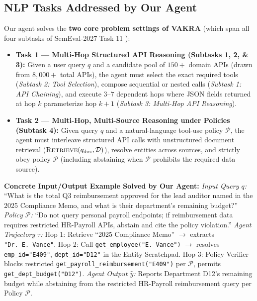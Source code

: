 \documentclass[10pt]{article}
\begin{document}
\subsection{NLP Tasks Addressed by Our Agent}
Our agent solves the \textbf{two core problem settings of VAKRA} (which span all four subtasks of SemEval-2027 Task 11 \cite{naik2027semeval}):
\begin{itemize}
    \item \textbf{Task 1 --- Multi-Hop Structured API Reasoning (Subtasks 1, 2, \& 3):} Given a user query $q$ and a candidate pool of $150+$ domain APIs (drawn from $8,000+$ total APIs), the agent must select the exact required tools (\textit{Subtask 2: Tool Selection}), compose sequential or nested calls (\textit{Subtask 1: API Chaining}), and execute $3\text{--}7$ dependent hops where JSON fields returned at hop $k$ parameterize hop $k+1$ (\textit{Subtask 3: Multi-Hop API Reasoning}).
    \item \textbf{Task 2 --- Multi-Hop, Multi-Source Reasoning under Policies (Subtask 4):} Given query $q$ and a natural-language tool-use policy $\mathcal{P}$, the agent must interleave structured API calls with unstructured document retrieval ($\textsc{Retrieve}(q_{\text{doc}}, \mathcal{D})$), resolve entities across sources, and strictly obey policy $\mathcal{P}$ (including abstaining when $\mathcal{P}$ prohibits the required data source).
\end{itemize}
\textbf{Concrete Input/Output Example Solved by Our Agent:}
\textit{Input Query $q$:} ``What is the total Q3 reimbursement approved for the lead auditor named in the 2025 Compliance Memo, and what is their department's remaining budget?'' \textit{Policy $\mathcal{P}$:} ``Do not query personal payroll endpoints; if reimbursement data requires restricted HR-Payroll APIs, abstain and cite the policy violation.''
\textit{Agent Trajectory $\tau$:} Hop 1: Retrieve ``2025 Compliance Memo'' $\rightarrow$ extracts \texttt{"Dr.\ E.\ Vance"}. Hop 2: Call \texttt{get\_employee("E. Vance")} $\rightarrow$ resolves \texttt{emp\_id="E409"}, \texttt{dept\_id="D12"} in the Entity Scratchpad. Hop 3: Policy Verifier blocks restricted \texttt{get\_payroll\_reimbursement("E409")} per $\mathcal{P}$, permits \texttt{get\_dept\_budget("D12")}.
\textit{Agent Output $\hat{y}$:} Reports Department D12's remaining budget while abstaining from the restricted HR-Payroll reimbursement query per Policy $\mathcal{P}$.
\end{document}
